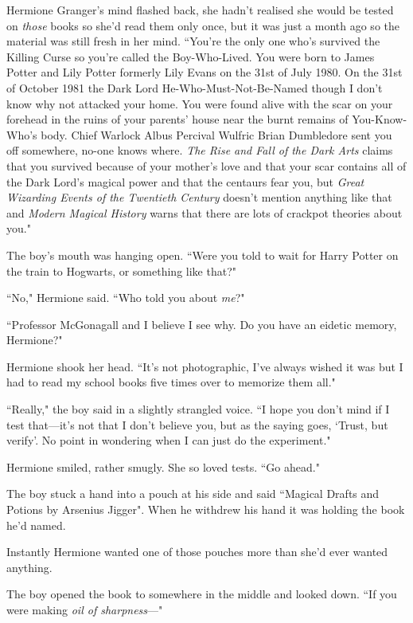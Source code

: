 Hermione Granger's mind flashed back, she hadn't realised she would be tested on \emph{those} books so she'd read them only once, but it was just a month ago so the material was still fresh in her mind. ``You're the only one who's survived the Killing Curse so you're called the Boy-Who-Lived. You were born to James Potter and Lily Potter formerly Lily Evans on the 31st of July 1980. On the 31st of October 1981 the Dark Lord He-Who-Must-Not-Be-Named though I don't know why not attacked your home. You were found alive with the scar on your forehead in the ruins of your parents' house near the burnt remains of You-Know-Who's body. Chief Warlock Albus Percival Wulfric Brian Dumbledore sent you off somewhere, no-one knows where. \emph{The Rise and Fall of the Dark Arts} claims that you survived because of your mother's love and that your scar contains all of the Dark Lord's magical power and that the centaurs fear you, but \emph{Great Wizarding Events of the Twentieth Century} doesn't mention anything like that and \emph{Modern Magical History} warns that there are lots of crackpot theories about you."

The boy's mouth was hanging open. ``Were you told to wait for Harry Potter on the train to Hogwarts, or something like that?"

``No," Hermione said. ``Who told you about \emph{me}?"

``Professor McGonagall and I believe I see why. Do you have an eidetic memory, Hermione?"

Hermione shook her head. ``It's not photographic, I've always wished it was but I had to read my school books five times over to memorize them all."

``Really," the boy said in a slightly strangled voice. ``I hope you don't mind if I test that—it's not that I don't believe you, but as the saying goes, `Trust, but verify'. No point in wondering when I can just do the experiment."

Hermione smiled, rather smugly. She so loved tests. ``Go ahead."

The boy stuck a hand into a pouch at his side and said ``Magical Drafts and Potions by Arsenius Jigger". When he withdrew his hand it was holding the book he'd named.

Instantly Hermione wanted one of those pouches more than she'd ever wanted anything.

The boy opened the book to somewhere in the middle and looked down. ``If you were making \emph{oil of sharpness}—"

